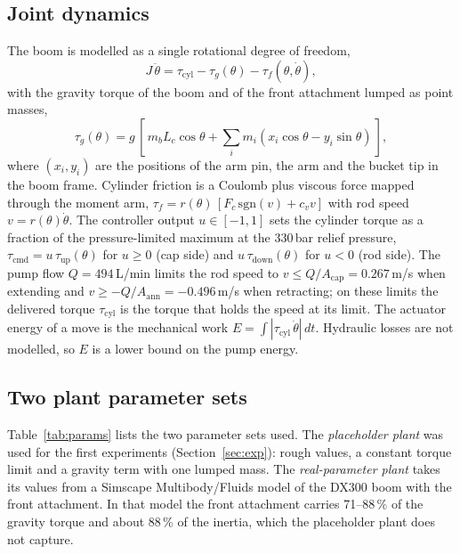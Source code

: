 \subsection{Joint dynamics}
The boom is modelled as a single rotational degree of freedom,
\begin{equation}
J\,\ddot\theta = \tau_\mathrm{cyl} - \tau_g(\theta) - \tau_f(\theta,\dot\theta),
\label{eq:dyn}
\end{equation}
with the gravity torque of the boom and of the front attachment lumped as point masses,
\begin{equation}
\tau_g(\theta) = g\,[\,m_b L_c\cos\theta + \textstyle\sum_i m_i(x_i\cos\theta - y_i\sin\theta)\,],
\label{eq:grav}
\end{equation}
where $(x_i, y_i)$ are the positions of the arm pin, the arm and the bucket tip in the boom frame.
Cylinder friction is a Coulomb plus viscous force mapped through the moment arm,
$\tau_f = r(\theta)\,[F_c\,\mathrm{sgn}(v) + c_v v]$ with rod speed $v=r(\theta)\dot\theta$.
The controller output $u\in[-1,1]$ sets the cylinder torque as a fraction of the
pressure-limited maximum at the 330\,bar relief pressure, %
$\tau_\mathrm{cmd}=u\,\tau_\mathrm{up}(\theta)$ for $u\ge0$ (cap side) and
$u\,\tau_\mathrm{down}(\theta)$ for $u<0$ (rod side).
The pump flow $Q=494$\,L/min %
limits the rod speed to $v\le Q/A_\mathrm{cap}=0.267$\,m/s when extending and
$v\ge -Q/A_\mathrm{ann}=-0.496$\,m/s when retracting; on these limits the delivered torque
$\tau_\mathrm{cyl}$ is the torque that holds the speed at its limit.
The actuator energy of a move is the mechanical work
$E = \int |\tau_\mathrm{cyl}\,\dot\theta|\,dt$.
Hydraulic losses are not modelled, so $E$ is a lower bound on the pump energy.

\subsection{Two plant parameter sets}
Table~\ref{tab:params} lists the two parameter sets used.
The \emph{placeholder plant} was used for the first experiments (Section~\ref{sec:exp}):
rough values, a constant torque limit and a gravity term with one lumped mass.
The \emph{real-parameter plant} takes its values from a Simscape Multibody/Fluids model of the
DX300 boom with the front attachment. In that model the front attachment carries 71--88\,\% of
the gravity torque and about 88\,\% of the inertia, which the placeholder plant does not capture.

